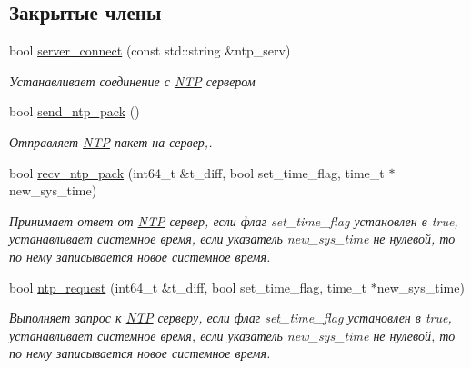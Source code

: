\subsection*{Закрытые члены}
\begin{DoxyCompactItemize}
\item 
bool \mbox{\hyperlink{classNTP_af39e8a73dc451c84f20451df932abf82}{server\+\_\+connect}} (const std\+::string \&ntp\+\_\+serv)
\begin{DoxyCompactList}\small\item\em Устанавливает соединение с \mbox{\hyperlink{classNTP}{N\+TP}} сервером \end{DoxyCompactList}\item 
bool \mbox{\hyperlink{classNTP_ab1a3d3f9d0edce03daadfe77a82a52e1}{send\+\_\+ntp\+\_\+pack}} ()
\begin{DoxyCompactList}\small\item\em Отправляет \mbox{\hyperlink{classNTP}{N\+TP}} пакет на сервер,. \end{DoxyCompactList}\item 
bool \mbox{\hyperlink{classNTP_ac04e08381f4a7522743a1f05e01e3d6b}{recv\+\_\+ntp\+\_\+pack}} (int64\+\_\+t \&t\+\_\+diff, bool set\+\_\+time\+\_\+flag, time\+\_\+t $\ast$new\+\_\+sys\+\_\+time)
\begin{DoxyCompactList}\small\item\em Принимает ответ от \mbox{\hyperlink{classNTP}{N\+TP}} сервер, если флаг set\+\_\+time\+\_\+flag установлен в true, устанавливает системное время, если указатель new\+\_\+sys\+\_\+time не нулевой, то по нему записывается новое системное время. \end{DoxyCompactList}\item 
bool \mbox{\hyperlink{classNTP_a685ca56d2db2d35537d267b6e84ba594}{ntp\+\_\+request}} (int64\+\_\+t \&t\+\_\+diff, bool set\+\_\+time\+\_\+flag, time\+\_\+t $\ast$new\+\_\+sys\+\_\+time)
\begin{DoxyCompactList}\small\item\em Выполняет запрос к \mbox{\hyperlink{classNTP}{N\+TP}} серверу, если флаг set\+\_\+time\+\_\+flag установлен в true, устанавливает системное время, если указатель new\+\_\+sys\+\_\+time не нулевой, то по нему записывается новое системное время. \end{DoxyCompactList}\end{DoxyCompactItemize}
